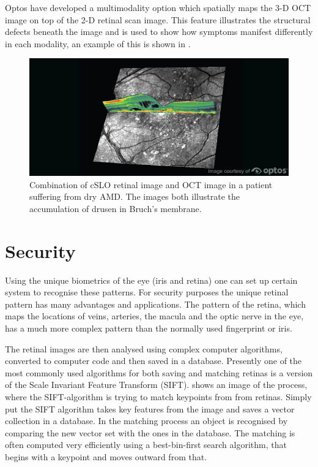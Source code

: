 Optos have developed a multimodality option which spatially maps the 3-D OCT
image on top of the 2-D retinal scan image. This feature illustrates the structural
defects beneath the image and is used to show how symptoms manifest differently in
each modality, an example of this is shown in .

\begin{figure}[htbp]
\centering
 \includegraphics{figures/multi}
\caption{Combination of cSLO retinal image and OCT image in a patient suffering from
dry AMD. The images both illustrate the accumulation of drusen in Bruch’s membrane.}
\label{fig:multi}
\end{figure}

\section{Security}

Using the unique biometrics of the eye (iris and retina) one can set up certain system
to recognise these patterns. For security purposes the unique retinal pattern has many
advantages and applications. The pattern of the retina, which maps the locations of veins,
arteries, the macula and the optic nerve in the eye, has a much more complex pattern than
the normally used fingerprint or iris.\cite{ortega_2009} 

The retinal images are then analysed using complex computer algorithms, converted to
computer code and then saved in a database. Presently one of the most commonly used
algorithms for both saving and matching retinas is a version of the Scale Invariant
Feature Transform (SIFT).  shows an image of the process, where the
SIFT-algorithm is trying to match keypoints from from retinas. Simply put the SIFT
algorithm takes key features from the image and saves a vector collection in a database.
In the matching process an object is recognised by comparing the new vector set with
the ones in the database. The matching is often computed very efficiently using a
best-bin-first search algorithm, that begins with a keypoint and moves outward from that. 

